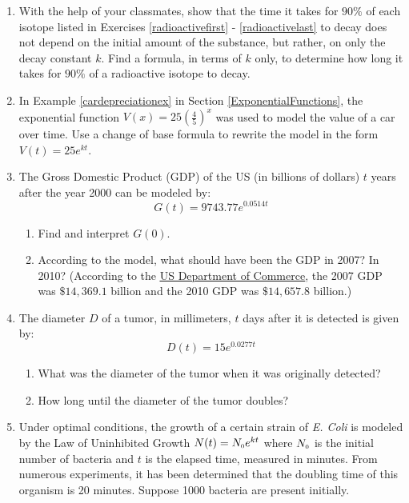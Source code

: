 \begin{enumerate}
\setcounter{enumi}{\value{HW}}

\item With the help of your classmates, show that the time it takes for $90 \%$ of each isotope listed in Exercises \ref{radioactivefirst} - \ref{radioactivelast} to decay does not depend on the initial amount of the substance, but rather, on only the decay constant $k$. Find a formula, in terms of $k$ only, to determine how long it takes for $90 \%$ of a radioactive isotope to decay. 


\item In Example \ref{cardepreciationex} in Section \ref{ExponentialFunctions}, the exponential function $V(x) = 25 \left(\frac{4}{5}\right)^{x}$ was used to model the value of a car over time.  Use a change of base formula to rewrite the model in the form $V(t) = 25e^{kt}$.

\item  The Gross Domestic Product (GDP) of the US (in billions of dollars) $t$ years after the year 2000 can be modeled by: \[ G(t) = 9743.77 e^{0.0514t}\]

\begin{enumerate}

\item  Find and interpret $G(0)$.

\item  According to the model, what should have been the GDP in 2007?  In 2010?  (According to the   \href{http://1.usa.gov/iimT40}{\underline{US Department of Commerce}}, the 2007 GDP was $\$14,369.1$ billion and the 2010 GDP was $\$14,657.8$ billion.)

\end{enumerate}

\item  The diameter $D$ of a tumor, in millimeters, $t$ days after it is detected is given by:  \[D(t) = 15e^{0.0277t} \]

\begin{enumerate}

\item  What was the diameter of the tumor when it was originally detected?

\item  How long until the diameter of the tumor doubles?

\end{enumerate}

\item  Under optimal conditions, the growth of a certain strain of \textit{E. Coli} is modeled by the Law of Uninhibited Growth $N(t) = N_{\text{\tiny $0$}} e^{kt}$ where $N_{\text{\tiny $0$}}$ is the initial number of bacteria and $t$ is the elapsed time, measured in minutes. From numerous experiments, it has been determined that the doubling time of this organism is 20 minutes. Suppose 1000 bacteria are present initially.


\end{enumerate}
